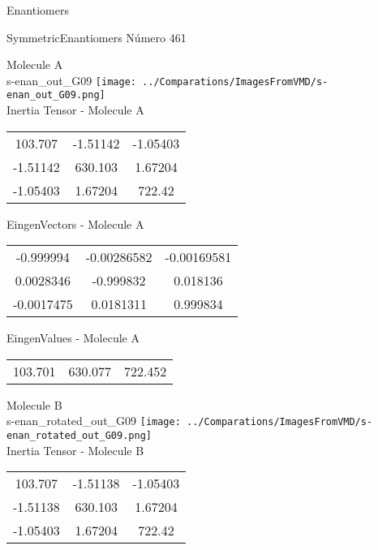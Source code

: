 \begin{center}
\vtab
\vtab
\textcolor{NavyBlue}{\Large Enantiomers}
\end{center}

 \newpage

\vtab[-2cm]
\begin{center}
{\large SymmetricEnantiomers \tab Número 461}
\end{center}
\begin{multicols}{2}
\begin{center}

Molecule A \\ 
s-enan\_out\_G09
\texttt{[image: ../Comparations/ImagesFromVMD/s-enan\_out\_G09.png]}
\\
Inertia Tensor - Molecule A \\
\vtab

\begin{tabular}{|c c c|}
103.707	 & 	-1.51142	 & 	-1.05403	 \\
-1.51142	 & 	630.103	 & 	1.67204	 \\
-1.05403	 & 	1.67204	 & 	722.42
\end{tabular}

\vtab
 EingenVectors - Molecule A     \\
\vtab
\begin{tabular}{|c c c|}
-0.999994	 & 	-0.00286582	 & 	-0.00169581	 \\
0.0028346	 & 	-0.999832	 & 	0.018136	 \\
-0.0017475	 & 	0.0181311	 & 	0.999834
\end{tabular}

\vtab
 EingenValues - Molecule A     \\
\vtab
\begin{tabular}{|c c c|}
103.701	 & 	630.077	 & 	722.452	 \\
\end{tabular}
\columnbreak

Molecule B \\ 
s-enan\_rotated\_out\_G09
\texttt{[image: ../Comparations/ImagesFromVMD/s-enan\_rotated\_out\_G09.png]}
\\
Inertia Tensor - Molecule B \\
\vtab

\begin{tabular}{|c c c|}
103.707	 & 	-1.51138	 & 	-1.05403	 \\
-1.51138	 & 	630.103	 & 	1.67204	 \\
-1.05403	 & 	1.67204	 & 	722.42
\end{tabular}


\end{center}
\end{multicols}
